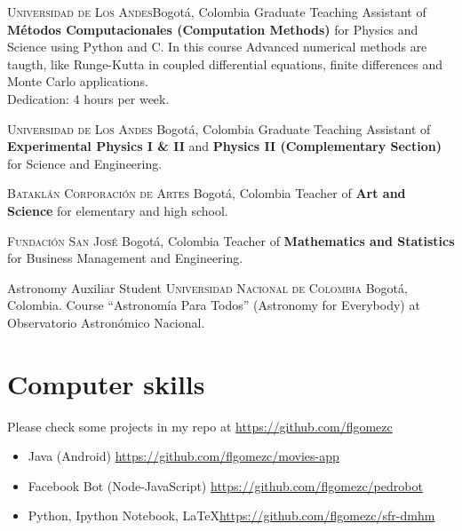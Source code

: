 \documentclass[12pt,letterpaper,sans]{moderncv}
\begin{document}
{\textsc{Universidad de Los Andes}}{Bogot\'a, Colombia}{}
{Graduate Teaching Assistant of \textbf{M\'etodos Computacionales (Computation Methods)} 
for Physics and Science using Python and C. In this course Advanced numerical methods 
are taugth, like Runge-Kutta in coupled differential equations, finite differences and
 Monte Carlo applications.\\
Dedication: 4 hours per week.}


{\textsc{Universidad de Los Andes}}
{Bogot\'a, Colombia}{}
{Graduate Teaching Assistant of \textbf{Experimental Physics I \& II} and 
\textbf{Physics II (Complementary Section)} for Science and Engineering.}


{\textsc{Batakl\'an Corporaci\'on de Artes}}
{Bogot\'a, Colombia}{}
{Teacher of \textbf{Art and Science} for elementary and high school.}

{\textsc{Fundaci\'on San Jos\'e}}
{Bogot\'a, Colombia}{}
{Teacher of \textbf{Mathematics and Statistics} for Business Management and Engineering.}


{Astronomy Auxiliar Student}
{\textsc{Universidad Nacional de Colombia}}
{Bogot\'a, Colombia.}{}
{Course ``Astronom\'ia Para Todos'' (Astronomy for Everybody) at Observatorio 
Astron\'omico Nacional.}


\section{Computer skills}

Please check some projects in my repo at \url{https://github.com/flgomezc}
\medskip

\begin{itemize}
\item Java (Android) \url{https://github.com/flgomezc/movies-app}
\item Facebook Bot (Node-JavaScript) \url{https://github.com/flgomezc/pedrobot}
\item Python, Ipython Notebook, \LaTeX \url{https://github.com/flgomezc/sfr-dmhm}
\end{itemize}
\end{document}
